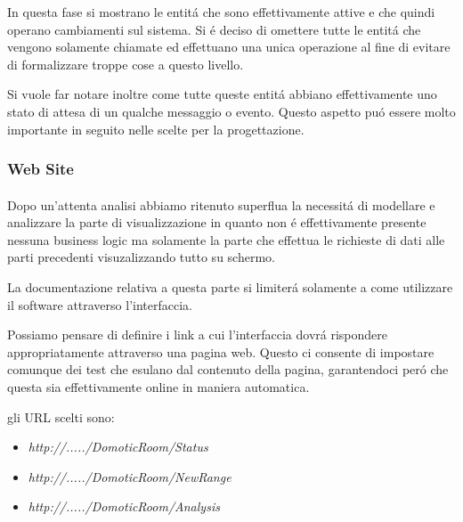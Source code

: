 In questa fase si mostrano le entit\'a che sono effettivamente attive e che quindi operano cambiamenti sul sistema. Si \'e deciso di omettere tutte le entit\'a che vengono solamente chiamate ed effettuano una unica operazione al fine di evitare di formalizzare troppe cose a questo livello.

Si vuole far notare inoltre come tutte queste entit\'a abbiano effettivamente uno stato di attesa di un qualche messaggio o evento. Questo aspetto pu\'o essere molto importante in seguito nelle scelte per la progettazione.

\newpage

\subsubsection{Web Site}

\paragraph{}Dopo un'attenta analisi abbiamo ritenuto superflua la necessit\'a di modellare e analizzare la parte di visualizzazione in quanto non \'e effettivamente presente nessuna business logic ma solamente la parte che effettua le richieste di dati alle parti precedenti visuzalizzando tutto su schermo.

La documentazione relativa a questa parte si limiter\'a solamente a come utilizzare il software attraverso l'interfaccia.

Possiamo pensare di definire i link a cui l'interfaccia dovr\'a rispondere appropriatamente attraverso una pagina web. Questo ci consente di impostare comunque dei test che esulano dal contenuto della pagina, garantendoci per\'o che questa sia effettivamente online in maniera automatica.

gli URL scelti sono:
\begin{itemize}
  \item \textit{http://...../DomoticRoom/Status}
  \item \textit{http://...../DomoticRoom/NewRange}
  \item \textit{http://...../DomoticRoom/Analysis}
\end{itemize}
